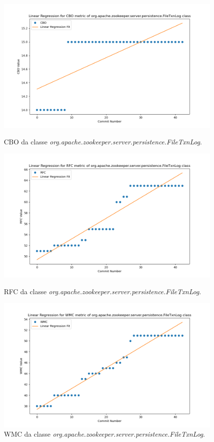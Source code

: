 \begin{figure}
    \centering
    \includegraphics[width=0.8\linewidth]{figuras/343-83cf0a93c37759334fab885c2010fa0b7d953f52/Class-org.apache.zookeeper.server.persistence.FileTxnLog/CBO.png}
    \caption{CBO da classe \textit{org.apache.zookeeper.server.persistence.FileTxnLog}.}
    \label{fig:CBO3xPerformanceClass}
    \centering
    \includegraphics[width=0.8\linewidth]{figuras/343-83cf0a93c37759334fab885c2010fa0b7d953f52/Class-org.apache.zookeeper.server.persistence.FileTxnLog/RFC.png}
    \caption{RFC da classe \textit{org.apache.zookeeper.server.persistence.FileTxnLog}.}
    \label{fig:RFC3xPerformanceClass}
    \centering
    \includegraphics[width=0.8\linewidth]{figuras/343-83cf0a93c37759334fab885c2010fa0b7d953f52/Class-org.apache.zookeeper.server.persistence.FileTxnLog/WMC.png}
    \caption{WMC da classe \textit{org.apache.zookeeper.server.persistence.FileTxnLog}.}
    \label{fig:WMC3xPerformanceClass}
\end{figure}


